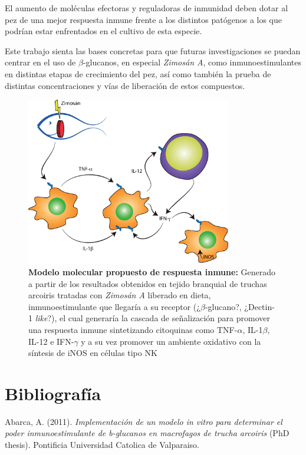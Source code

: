 \documentclass[12pt,letterpaper,oneside]{scrbook}
\begin{document}
El aumento de moléculas efectoras y reguladoras de inmunidad deben dotar
al pez de una mejor respuesta inmune frente a los distintos patógenos a
los que podrían estar enfrentados en el cultivo de esta especie.

Este trabajo sienta las bases concretas para que futuras investigaciones
se puedan centrar en el uso de \(\beta\)-glucanos, en especial
\emph{Zimosán A}, como inmunoestimulantes en distintas etapas de
crecimiento del pez, así como también la prueba de distintas
concentraciones y vías de liberación de estos compuestos.

\begin{figure}[h!]
\centering
    \includegraphics[width=0.8\textwidth]{modelo}
    \caption[Modelo molecular propuesto de respuesta inmune]{\textbf{Modelo molecular propuesto de respuesta inmune:} Generado a partir de los resultados obtenidos en tejido branquial de truchas arcoiris tratadas con \emph{Zimosán A} liberado en dieta, inmunoestimulante que llegaría a su receptor (¿$\beta$-glucano?, ¿Dectin-1 \emph{like}?), el cual generaría la cascada de señalización para promover una respuesta inmune sintetizando citoquinas como TNF-$\alpha$, IL-1$\beta$, IL-12 e IFN-$\gamma$ y a su vez promover un ambiente oxidativo con la síntesis de iNOS en células tipo NK}
    \label{fig:modelo}
\end{figure}

\chapter{Bibliografía}

Abarca, A. (2011). \emph{Implementación de un modelo in vitro para
determinar el poder inmunoestimulante de b-glucanos en macrofagos de
trucha arcoiris} (PhD thesis). Pontificia Universidad Catolica de
Valparaiso.
\end{document}
